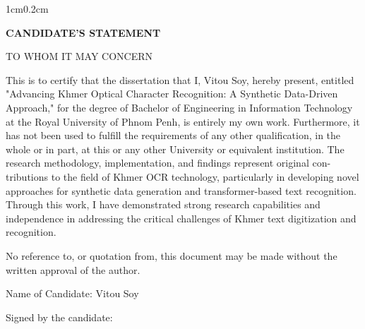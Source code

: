 \begin{adjustwidth}{1cm}{0.2cm}

\begin{center}
    {\englishfont\fontsize{14pt}{21pt}\selectfont \textbf{CANDIDATE'S STATEMENT} \par}
\end{center}
\label{candidate-statement}

\vspace{0.2cm}
\setlength{\parindent}{0pt}
\vspace{0.3cm}

{\englishfont\fontsize{13.5pt}{17pt}\selectfont \setlength{\parindent}{0pt} TO WHOM IT MAY CONCERN \par}

\vspace{0.5cm}
    \setlength{\parindent}{0pt}\englishfont\fontsize{13.5pt}{17pt}\selectfont 
    {\large This is to certify that the dissertation that I, Vitou Soy, hereby present, entitled "Advancing
    Khmer Optical Character Recognition: A Synthetic Data-Driven Approach," for the degree
    of Bachelor of Engineering in Information Technology at the Royal University of Phnom Penh, is
    entirely my own work. Furthermore, it has not been used to fulfill the requirements of any
    other qualification, in the whole or in part, at this or any other University or equivalent
    institution. The research methodology, implementation, and findings represent original con-
    tributions to the field of Khmer OCR technology, particularly in developing novel approaches
    for synthetic data generation and transformer-based text recognition. Through this work, I
    have demonstrated strong research capabilities and independence in addressing the critical
    challenges of Khmer text digitization and recognition.\par}

    \vspace{0.5cm}
    \setlength{\parindent}{0pt}
    {\large No reference to, or quotation from, this document may be made without the written
    approval of the author.\par}
    \vspace{0.5cm}
    \setlength{\parindent}{0pt}
    {\large Name of Candidate: Vitou Soy\par}
    
    \vspace{-0.1cm}
    \setlength{\parindent}{0pt}
    {\large Signed by the candidate: \dotfill\par}
    

\end{adjustwidth}
